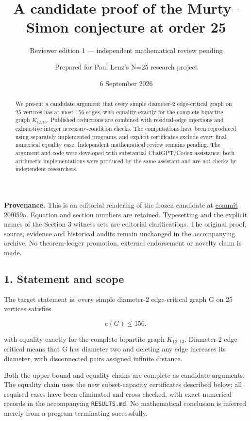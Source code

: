 \documentclass[
  11pt,
]{article}
\title{A candidate proof of the Murty--Simon conjecture at order 25}
\subtitle{Reviewer edition 1 --- independent mathematical review
pending}
\author{Prepared for Paul Lenz's N=25 research project}
\date{6 September 2026}
\begin{document}
\maketitle

\begin{abstract}
We present a candidate argument that every simple diameter-2 edge-critical graph on 25 vertices has at most 156 edges, with equality exactly for the complete bipartite graph $K_{12,13}$. Published reductions are combined with residual-edge injections and exhaustive integer necessary-condition checks. The computations have been reproduced using separately implemented programs, and explicit certificates exclude every final numerical equality case. Independent mathematical review remains pending. The argument and code were developed with substantial ChatGPT/Codex assistance; both arithmetic implementations were produced by the same assistant and are not checks by independent researchers.
\end{abstract}

\textbf{Provenance.} This is an editorial rendering of the frozen
candidate at
\href{https://github.com/paullenz/MurtySimon25/commit/20f059a03b2f5e2b34b3e0fa5d2373ae65b14300}{commit
20f059a}. Equation and section numbers are retained. Typesetting and the
explicit names of the Section 3 witness sets are editorial
clarifications. The original proof, source, evidence and historical
audits remain unchanged in the accompanying archive. No theorem-ledger
promotion, external endorsement or novelty claim is made.

\hypertarget{statement-and-scope}{%
\subsection{1. Statement and scope}\label{statement-and-scope}}

The target statement is: every simple diameter-2 edge-critical graph G
on 25 vertices satisfies

\[
e(G)\le156,
\]

with equality exactly for the complete bipartite graph
\ensuremath{K_{12,13}}. Diameter-2 edge-critical means that G has
diameter two and deleting any edge increases its diameter, with
disconnected pairs assigned infinite distance.

Both the upper-bound and equality chains are complete as candidate
arguments. The equality chain uses the new subset-capacity certificates
described below; all required cases have been eliminated and
cross-checked, with exact numerical records in the accompanying
\texttt{RESULTS.md}. No mathematical conclusion is inferred merely from
a program terminating successfully.
\end{document}
